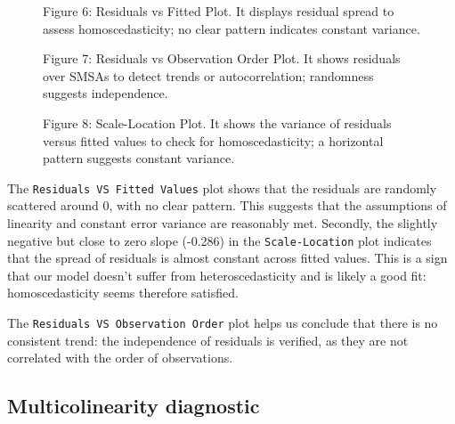 \documentclass[
  12pt,
]{article}
\begin{document}
\begin{figure}[htbp]
\vspace{-1em}
  \centering
  \begin{minipage}[b]{0.3\linewidth}
    {\fontsize{12}{14}\selectfont Figure 6: Residuals vs Fitted Plot. It displays residual spread to assess homoscedasticity; no clear pattern indicates constant variance.\par}
  \end{minipage}
  \hfill
  \begin{minipage}[b]{0.3\linewidth}
    {\fontsize{12}{14}\selectfont Figure 7: Residuals vs Observation Order Plot. It shows residuals over SMSAs to detect trends or autocorrelation; randomness suggests independence.\par}
  \end{minipage}
  \hfill
  \begin{minipage}[b]{0.3\linewidth}
    {\fontsize{12}{14}\selectfont Figure 8: Scale-Location Plot. It shows the variance of residuals versus fitted values to check for homoscedasticity; a horizontal pattern suggests constant variance.\par}
  \end{minipage}
\end{figure}

The \texttt{Residuals\ VS\ Fitted\ Values} plot shows that the residuals
are randomly scattered around 0, with no clear pattern. This suggests
that the assumptions of linearity and constant error variance are
reasonably met. Secondly, the slightly negative but close to zero slope
(-0.286) in the \texttt{Scale-Location} plot indicates that the spread
of residuals is almost constant across fitted values. This is a sign
that our model doesn't suffer from heteroscedasticity and is likely a
good fit: homoscedasticity seems therefore satisfied.

The \texttt{Residuals\ VS\ Observation\ Order} plot helps us conclude
that there is no consistent trend: the independence of residuals is
verified, as they are not correlated with the order of observations.

\vspace{-0.5em}

\subsection{Multicolinearity
diagnostic}\label{multicolinearity-diagnostic}

\noindent
\end{document}
